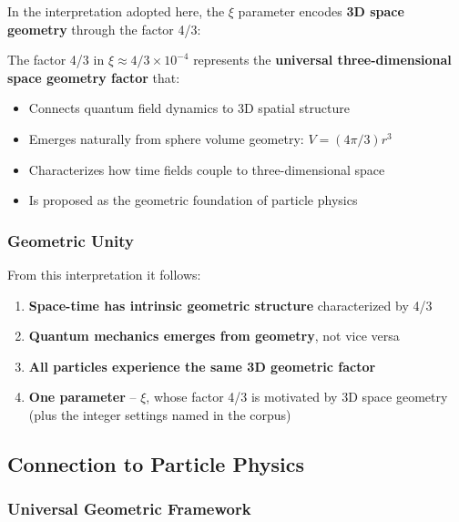 	In the interpretation adopted here, the $\xi$ parameter encodes \textbf{3D space geometry} through the factor 4/3:
	
	\begin{tcolorbox}[colback=yellow!5!white,colframe=orange!75!black,title=Three-Dimensional Space Geometry Factor]
		The factor 4/3 in $\xi \approx 4/3 \times 10^{-4}$ represents the \textbf{universal three-dimensional space geometry factor} that:
		\begin{itemize}
			\item Connects quantum field dynamics to 3D spatial structure
			\item Emerges naturally from sphere volume geometry: $V = (4\pi/3)r^3$
			\item Characterizes how time fields couple to three-dimensional space
			\item Is proposed as the geometric foundation of particle physics
		\end{itemize}
	\end{tcolorbox}
	
	\subsubsection{Geometric Unity}
	\label{subsubsec:geometric_unity}
	
	From this interpretation it follows:
	\begin{enumerate}
		\item \textbf{Space-time has intrinsic geometric structure} characterized by 4/3
		\item \textbf{Quantum mechanics emerges from geometry}, not vice versa
		\item \textbf{All particles experience the same 3D geometric factor}
		\item \textbf{One parameter} -- $\xi$, whose factor 4/3 is motivated by 3D space geometry (plus the integer settings named in the corpus)
	\end{enumerate}
	
	\subsection{Connection to Particle Physics}
	\label{subsec:connection_particle_physics}
	
	\subsubsection{Universal Geometric Framework}
	\label{subsubsec:universal_framework}
	
